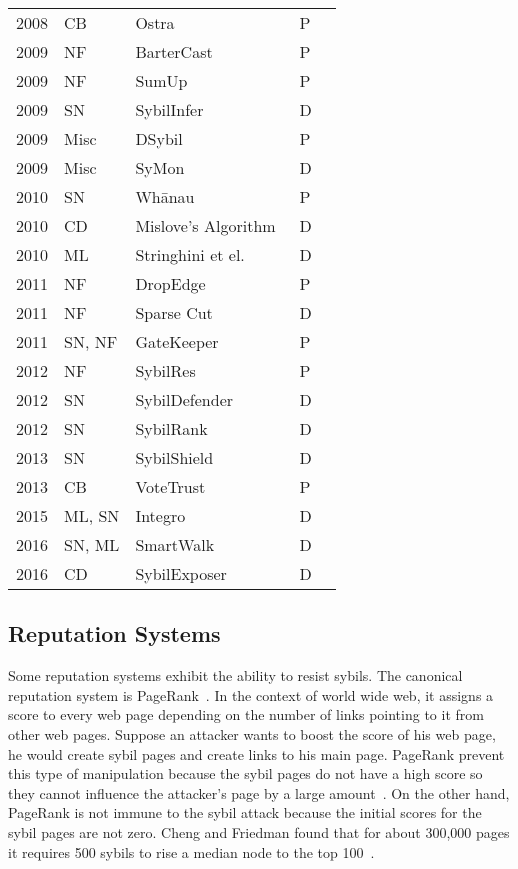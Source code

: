\begin{table}[]
\begin{tabular}{lllll}
  2008 & CB & Ostra~\cite{mislove2008ostra} & P &  \\
  2009 & NF & BarterCast~\cite{meulpolder2009bartercast} & P &  \\
  2009 & NF & SumUp~\cite{tran2009sybil} & P &  \\
  2009 & SN & SybilInfer~\cite{danezis2009sybilinfer} & D &  \\
  2009 & Misc & DSybil~\cite{yu2009dsybil} & P & \\
  2009 & Misc & SyMon~\cite{jyothi2009symon} & D & \\
  2010 & SN & Wh\={a}nau~\cite{lesniewski2010whanau} & P &  \\
  2010 & CD & Mislove's Algorithm~\cite{viswanath2010analysis} & D &  \\
  2010 & ML & Stringhini et el.~\cite{stringhini2010detecting} & D &  \\
  2011 & NF & DropEdge~\cite{seuken2011sybil} & P &  \\
  2011 & NF & Sparse Cut~\cite{kurve2011sybil} & D &  \\
  2011 & SN, NF & GateKeeper~\cite{tran2011optimal} & P &  \\
  2012 & NF & SybilRes~\cite{delaviz2012sybilres} & P &  \\
  2012 & SN & SybilDefender~\cite{wei2012sybildefender} & D &  \\
  2012 & SN & SybilRank~\cite{cao2012aiding} & D &  \\
  2013 & SN & SybilShield~\cite{shi2013sybilshield} & D &  \\
  2013 & CB & VoteTrust~\cite{xue2013votetrust} & P &  \\
  2015 & ML, SN & Integro~\cite{boshmaf2015integro} & D &  \\
  2016 & SN, ML & SmartWalk~\cite{liu2016smartwalk} & D &  \\
  2016 & CD & SybilExposer~\cite{misra2016sybilexposer} & D &
\end{tabular}
\end{table}

\subsection{Reputation Systems}
Some reputation systems exhibit the ability to resist sybils. The canonical
reputation system is PageRank~\cite{page1999pagerank}. In the context of world
wide web, it assigns a score to every web page depending on the number of links
pointing to it from other web pages. Suppose an attacker wants to boost the
score of his web page, he would create sybil pages and create links to his main
page. PageRank prevent this type of manipulation because the sybil pages do not
have a high score so they cannot influence the attacker's page by a large
amount~\cite{baeza2005pagerank}. On the other hand, PageRank is not immune to
the sybil attack because the initial scores for the sybil pages are not zero.
Cheng and Friedman found that for about 300,000 pages it requires 500 sybils to
rise a median node to the top 100~\cite{cheng2006manipulability}.

